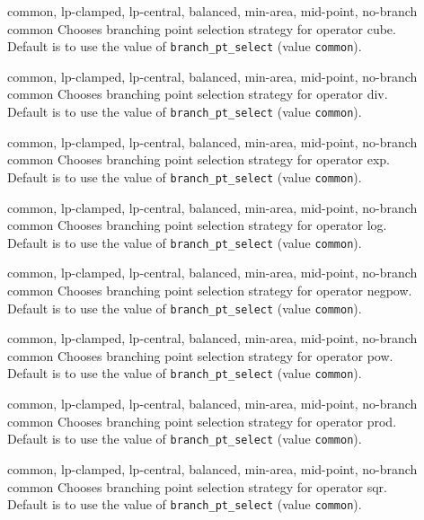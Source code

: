 %
{\ttfamily common, lp-clamped, lp-central, balanced, min-area, mid-point, no-branch}%
{common}%
{Chooses branching point selection strategy for operator cube.\\
Default is to use the value of \texttt{branch\_pt\_select} (value \texttt{common}).}%
{}

%
{\ttfamily common, lp-clamped, lp-central, balanced, min-area, mid-point, no-branch}%
{common}%
{Chooses branching point selection strategy for operator div.\\
Default is to use the value of \texttt{branch\_pt\_select} (value \texttt{common}).}%
{}

%
{\ttfamily common, lp-clamped, lp-central, balanced, min-area, mid-point, no-branch}%
{common}%
{Chooses branching point selection strategy for operator exp.\\
Default is to use the value of \texttt{branch\_pt\_select} (value \texttt{common}).}%
{}

%
{\ttfamily common, lp-clamped, lp-central, balanced, min-area, mid-point, no-branch}%
{common}%
{Chooses branching point selection strategy for operator log.\\
Default is to use the value of \texttt{branch\_pt\_select} (value \texttt{common}).}%
{}

%
{\ttfamily common, lp-clamped, lp-central, balanced, min-area, mid-point, no-branch}%
{common}%
{Chooses branching point selection strategy for operator negpow.\\
Default is to use the value of \texttt{branch\_pt\_select} (value \texttt{common}).}%
{}

%
{\ttfamily common, lp-clamped, lp-central, balanced, min-area, mid-point, no-branch}%
{common}%
{Chooses branching point selection strategy for operator pow.\\
Default is to use the value of \texttt{branch\_pt\_select} (value \texttt{common}).}%
{}

%
{\ttfamily common, lp-clamped, lp-central, balanced, min-area, mid-point, no-branch}%
{common}%
{Chooses branching point selection strategy for operator prod.\\
Default is to use the value of \texttt{branch\_pt\_select} (value \texttt{common}).}%
{}

%
{\ttfamily common, lp-clamped, lp-central, balanced, min-area, mid-point, no-branch}%
{common}%
{Chooses branching point selection strategy for operator sqr.\\
Default is to use the value of \texttt{branch\_pt\_select} (value \texttt{common}).}%
{}

